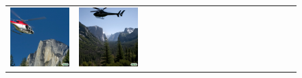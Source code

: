 \begin{figure}[ht!]
\begin{adjustwidth}{-0.8in}{-0.5in}
\begin{tabular}{cccccccccccccccccccc}
\multicolumn{2}{c}{\includegraphics[width=\threebythreecolwidth\textwidth]{figures/cherries/yosemite1.jpg}} &
\multicolumn{2}{c}{\includegraphics[width=\threebythreecolwidth\textwidth]{figures/cherries/yosemite2.jpg}} &

\end{tabular}
\end{adjustwidth}
\end{figure}
